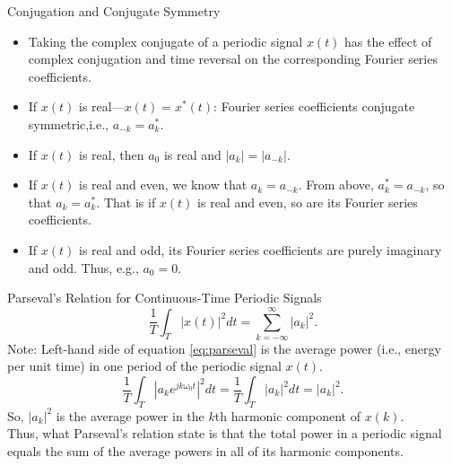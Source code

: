 \begin{frame}[plain]{Conjugation and Conjugate Symmetry}
    {

        \begin{itemize}[<+->]
          \item Taking the complex conjugate of a periodic signal $x(t)$ has the effect of complex conjugation and \alert{time reversal} on the corresponding Fourier series coefficients.
          \item If $x(t)$ is real---$x(t) = x^\ast(t)$: Fourier series coefficients conjugate symmetric,i.e., $a_{-k} = a^\ast_k$.
          \item If $x(t)$ is real, then $a_0$ is real and $|a_k| = |a_{-k}|$.
          \item If $x(t)$ is real and even, we know that $a_k = a_{-k}$. From above, $a^\ast_k = a_{-k}$, so that $a_{k} = a^\ast_k$. That is if $x(t)$ is real and even, so are its Fourier series coefficients.
          \item If $x(t)$ is real and odd, its Fourier series coefficients are purely imaginary and odd. Thus, e.g., $a_0 = 0$.%
        \end{itemize}
    }
\end{frame}


\begin{frame}{Parseval's Relation for Continuous-Time Periodic Signals}
    \begin{equation}\label{eq:parseval}
        \frac{1}{T}\int_{T} |x(t)|^2dt = \sum_{k=-\infty}^{\infty}|a_k|^2.
    \end{equation}
    {
        Note: Left-hand side of equation \ref{eq:parseval} is the average power (i.e., energy per unit time) in one period of the periodic signal $x(t)$.\\

        \begin{equation}
            \frac{1}{T}\int_{T} \left| a_k e^{jk\omega_0 t}\right|^2dt = \frac{1}{T}\int_{T} \left| a_k \right|^2dt = |a_k|^2.
        \end{equation}
        So, $|a_k|^2$ is the average power in the $k$th harmonic component of $x(k)$.\\
        Thus, what Parseval's relation state is that the total power in a periodic signal equals the sum of the average powers in all of its harmonic components.
    }
\end{frame}


